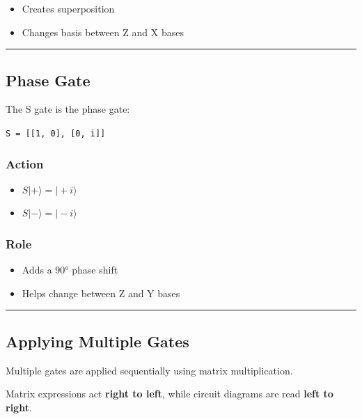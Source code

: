 \documentclass[
]{article}
\providecommand{\tightlist}{%
  \setlength{\itemsep}{0pt}\setlength{\parskip}{0pt}}
\begin{document}
\begin{itemize}
\tightlist
\item
  Creates superposition
\item
  Changes basis between Z and X bases
\end{itemize}

\begin{center}\rule{0.5\linewidth}{0.5pt}\end{center}

\subsection{Phase Gate}\label{phase-gate}

The S gate is the phase gate:

\texttt{S\ =\ {[}{[}1,\ 0{]},\ {[}0,\ i{]}{]}}

\subsubsection{Action}\label{action-1}

\begin{itemize}
\tightlist
\item $S|+\rangle = |+i\rangle$
  \item $S|-\rangle = |-i\rangle$
\end{itemize}

\subsubsection{Role}\label{role-1}

\begin{itemize}
\tightlist
\item
  Adds a 90° phase shift
\item
  Helps change between Z and Y bases
\end{itemize}

\begin{center}\rule{0.5\linewidth}{0.5pt}\end{center}

\subsection{Applying Multiple Gates}\label{applying-multiple-gates}

Multiple gates are applied sequentially using matrix multiplication.

Matrix expressions act \textbf{right to left}, while circuit diagrams
are read \textbf{left to right}.
\end{document}
